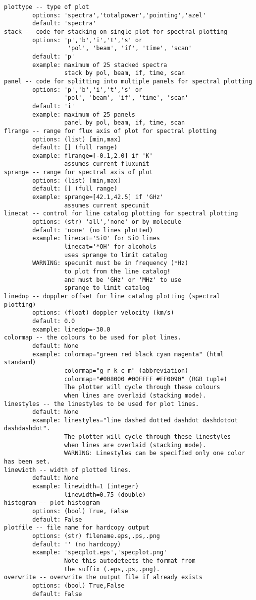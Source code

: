 \begin{verbatim}
plottype -- type of plot
        options: 'spectra','totalpower','pointing','azel'
        default: 'spectra'
stack -- code for stacking on single plot for spectral plotting
        options: 'p','b','i','t','s' or
                  'pol', 'beam', 'if', 'time', 'scan'
        default: 'p'
        example: maximum of 25 stacked spectra
                 stack by pol, beam, if, time, scan
panel -- code for splitting into multiple panels for spectral plotting
        options: 'p','b','i','t','s' or
                 'pol', 'beam', 'if', 'time', 'scan'
        default: 'i'
        example: maximum of 25 panels
                 panel by pol, beam, if, time, scan
flrange -- range for flux axis of plot for spectral plotting
        options: (list) [min,max]
        default: [] (full range)
        example: flrange=[-0.1,2.0] if 'K'
                 assumes current fluxunit
sprange -- range for spectral axis of plot
        options: (list) [min,max]
        default: [] (full range)
        example: sprange=[42.1,42.5] if 'GHz'
                 assumes current specunit
linecat -- control for line catalog plotting for spectral plotting
        options: (str) 'all','none' or by molecule
        default: 'none' (no lines plotted)
        example: linecat='SiO' for SiO lines
                 linecat='*OH' for alcohols
                 uses sprange to limit catalog
        WARNING: specunit must be in frequency (*Hz)
                 to plot from the line catalog!
                 and must be 'GHz' or 'MHz' to use
                 sprange to limit catalog
linedop -- doppler offset for line catalog plotting (spectral plotting)
        options: (float) doppler velocity (km/s)
        default: 0.0
        example: linedop=-30.0
colormap -- the colours to be used for plot lines.
        default: None
        example: colormap="green red black cyan magenta" (html standard)
                 colormap="g r k c m" (abbreviation)
                 colormap="#008000 #00FFFF #FF0090" (RGB tuple)
                 The plotter will cycle through these colours
                 when lines are overlaid (stacking mode).
linestyles -- the linestyles to be used for plot lines.
        default: None
        example: linestyles="line dashed dotted dashdot dashdotdot dashdashdot".
                 The plotter will cycle through these linestyles
                 when lines are overlaid (stacking mode).
                 WARNING: Linestyles can be specified only one color has been set.
linewidth -- width of plotted lines.
        default: None
        example: linewidth=1 (integer)
                 linewidth=0.75 (double)
histogram -- plot histogram
        options: (bool) True, False
        default: False
plotfile -- file name for hardcopy output
        options: (str) filename.eps,.ps,.png
        default: '' (no hardcopy)
        example: 'specplot.eps','specplot.png'
                 Note this autodetects the format from
                 the suffix (.eps,.ps,.png).
overwrite -- overwrite the output file if already exists
        options: (bool) True,False
        default: False
\end{verbatim}

